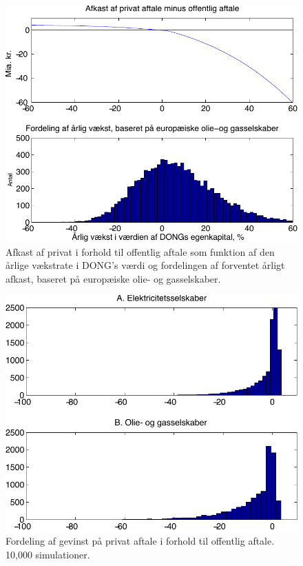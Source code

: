 \documentclass{article}
\begin{document}
\begin{figure}
\caption{Afkast af privat i forhold til offentlig aftale som funktion af den \aa{}rlige v\ae{}kstrate i DONG's v\ae{}rdi og fordelingen af forventet \aa{}rligt afkast, baseret p\aa{} europ\ae{}iske olie- og gasselskaber.}
\label{fig:combine2}
\centerline{\includegraphics[scale=0.8]{../matlab/figs/afkast_hist_combine_oilgas_guan}}
\end{figure}


\begin{figure}
\caption{Fordeling af gevinst på privat aftale i forhold til offentlig aftale. 10,000 simulationer. }
\label{fig:sim}
\centerline{\includegraphics[scale=0.8]{../matlab/figs/sim_return_guan}}
\end{figure}
\end{document}
